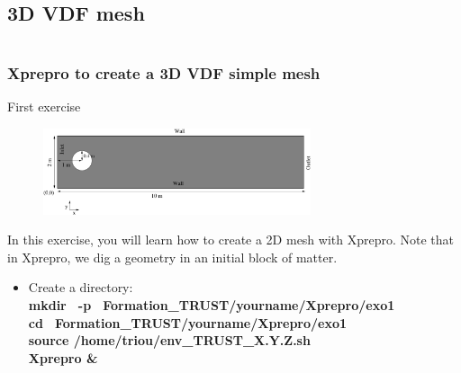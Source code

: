 \documentclass[10pt, hyperref={unicode=true,pdfusetitle, bookmarks=true,bookmarksnumbered=false,bookmarksopen=false, breaklinks=false,pdfborder={0 0 1},backref=true,colorlinks=true,linkcolor=darkblue,pageanchor}]{beamer}
\begin{document}
\subsection{3D VDF mesh}
\begin{frame}
\begin{columns}[c] 
\tableofcontents[sections={1-9},currentsection, currentsubsection]
\tableofcontents[sections={10-16},currentsection, currentsubsection]
\end{columns}
\end{frame}
\begin{frame}
\frametitle{Xprepro to create a 3D VDF simple mesh}
\begin{block}{First exercise}

\begin{figure}
\includegraphics[width=0.7\textwidth]{PICTURES/xprepro0.pdf}
\end{figure}

In this exercise, you will learn how to create a 2D mesh with Xprepro. 
Note that in Xprepro, we dig a geometry in an initial block of matter.
\vspace{0.2cm}

\begin{itemize}
\item Create a directory:\\
\textbf{mkdir \, -p \, Formation\_TRUST/yourname/Xprepro/exo1} \\
\textbf{cd \, Formation\_TRUST/yourname/Xprepro/exo1} \\
\textbf{source /home/triou/env\_TRUST\_X.Y.Z.sh }\\
\textbf{Xprepro \&} 
\end{itemize}

\end{block}
\end{frame}
\end{document}
